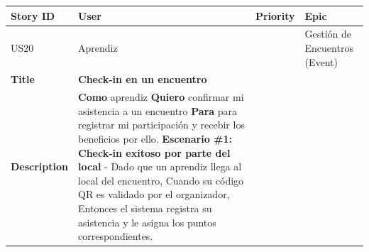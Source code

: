 {\def\LTcaptype{none} %
\begin{longtable}[]{@{}
  >{\raggedright\arraybackslash}p{}
  >{\raggedright\arraybackslash}p{}
  >{\raggedright\arraybackslash}p{}
  >{\raggedright\arraybackslash}p{}@{}}
\toprule\noalign{}
\begin{minipage}[b]{\linewidth}\raggedright
Story ID
\end{minipage} & \begin{minipage}[b]{\linewidth}\raggedright
User
\end{minipage} & \begin{minipage}[b]{\linewidth}\raggedright
Priority
\end{minipage} & \begin{minipage}[b]{\linewidth}\raggedright
Epic
\end{minipage} \\
\midrule\noalign{}
\endhead
\bottomrule\noalign{}
\endlastfoot
US20 & Aprendiz & 8 & Gestión de Encuentros (Event) \\
\textbf{Title} & \textbf{Check-in en un encuentro} & & \\
\textbf{Description} & \textbf{Como} aprendiz \textbf{Quiero} confirmar
mi asistencia a un encuentro \textbf{Para} para registrar mi
participación y recebir los beneficios por ello. \textbf{Escenario \#1:
Check-in exitoso por parte del local} - Dado que un aprendiz llega al
local del encuentro, Cuando su código QR es validado por el organizador,
Entonces el sistema registra su asistencia y le asigna los puntos
correspondientes. & & \\
\end{longtable}
}

